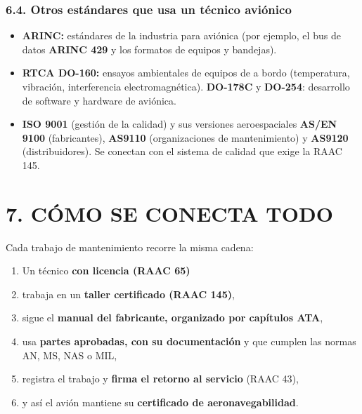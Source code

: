 \subsubsection*{6.4. Otros estándares que usa un técnico aviónico}
\begin{itemize}
  \item \textbf{ARINC:} estándares de la industria para aviónica (por ejemplo, el bus de datos
        \textbf{ARINC 429} y los formatos de equipos y bandejas).
  \item \textbf{RTCA DO-160:} ensayos ambientales de equipos de a bordo (temperatura, vibración,
        interferencia electromagnética). \textbf{DO-178C} y \textbf{DO-254}: desarrollo de
        software y hardware de aviónica.
  \item \textbf{ISO 9001} (gestión de la calidad) y sus versiones aeroespaciales \textbf{AS/EN
        9100} (fabricantes), \textbf{AS9110} (organizaciones de mantenimiento) y \textbf{AS9120}
        (distribuidores). Se conectan con el sistema de calidad que exige la RAAC 145.
\end{itemize}

\section*{7. CÓMO SE CONECTA TODO}
Cada trabajo de mantenimiento recorre la misma cadena:
\begin{enumerate}
  \item Un técnico \textbf{con licencia (RAAC 65)}
  \item trabaja en un \textbf{taller certificado (RAAC 145)},
  \item sigue el \textbf{manual del fabricante, organizado por capítulos ATA},
  \item usa \textbf{partes aprobadas, con su documentación} y que cumplen las normas AN, MS, NAS
        o MIL,
  \item registra el trabajo y \textbf{firma el retorno al servicio} (RAAC 43),
  \item y así el avión mantiene su \textbf{certificado de aeronavegabilidad}.
\end{enumerate}


